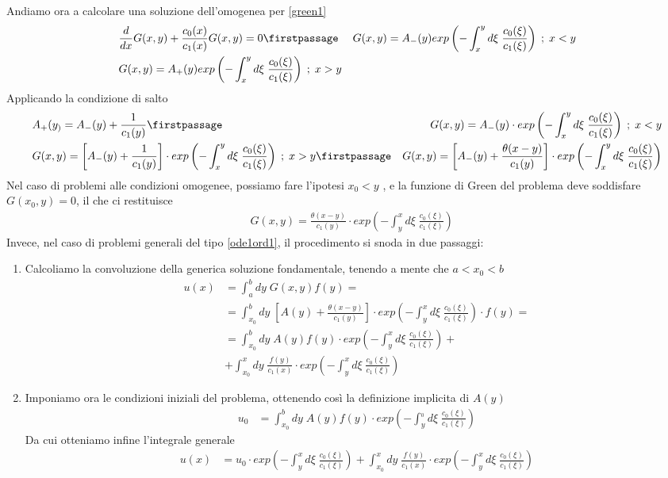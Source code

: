 \newpage
Andiamo ora a calcolare una soluzione dell'omogenea per \ref{green1}
\begin{align}
	&\frac{d}{dx}G(x,y) + \frac{c_0(x)}{c_1(x)} G(x,y)  = 0\firstpassage
	&G(x,y) = A_-(y) exp\left( - \int_{x}^{y} d\xi\; \frac{c_0(\xi)}{c_1(\xi)}\right) \; ; \;  x<y\\
	&G(x,y) = A_+(y) exp\left( - \int_{x}^{y} d\xi\; \frac{c_0(\xi)}{c_1(\xi)}\right) \; ; \; x>y
\end{align}
Applicando la condizione di salto
\begin{align}
	&A_+(y_) = A_-(y) + \frac{1}{c_1(y)} \firstpassage
	&G(x,y) = A_-(y) \cdot exp\left( - \int_{x}^{y} d\xi\; \frac{c_0(\xi)}{c_1(\xi)}\right) \; ; \;  x<y\\
	&G(x,y) = \left[  A_-(y) + \frac{1}{c_1(y)} \right] \cdot exp\left( - \int_{x}^{y} d\xi\; \frac{c_0(\xi)}{c_1(\xi)}\right) \; ; \;  x>y \firstpassage
	&G(x,y) = \left[  A_-(y) + \frac{\theta(x-y)}{c_1(y)} \right] \cdot exp\left( - \int_{x}^{y} d\xi\; \frac{c_0(\xi)}{c_1(\xi)}\right)	
\end{align}
Nel caso di problemi alle condizioni omogenee, possiamo fare l'ipotesi $x_0 < y$ , e la funzione di Green del problema deve soddisfare $G(x_0,y) = 0$, il che ci restituisce
\begin{align}
	&G(x,y) = \frac{\theta(x-y)}{c_1(y)} \cdot exp\left( - \int_{y}^{x} d\xi\; \frac{c_0(\xi)}{c_1(\xi)}\right)	
\end{align}
Invece, nel caso di problemi generali del tipo \ref{ode1ord1}, il procedimento si snoda in due passaggi:
\begin{enumerate}
	\item Calcoliamo la convoluzione della generica soluzione fondamentale, tenendo a mente che $a<x_0<b$
	\begin{align}
		u(x) &= \int_a^b dy \; G(x,y) f(y) =	\nonumber\\
		&= \int_{x_0}^b dy \;\left[  A(y) + \frac{\theta(x-y)}{c_1(y)} \right] \cdot exp\left( - \int_{y}^{x} d\xi\; \frac{c_0(\xi)}{c_1(\xi)}\right) \cdot f(y) =	\nonumber\\
		&= \int_{x_0}^b dy \; A(y) f(y) \cdot exp\left( - \int_{y}^{x} d\xi\; \frac{c_0(\xi)}{c_1(\xi)}\right) + \nonumber\\
		&+ \int_{x_0}^x dy \;  \frac{f(y)}{c_1(x)} \cdot exp\left( - \int_{y}^{x} d\xi\; \frac{c_0(\xi)}{c_1(\xi)}\right) 
	\end{align}
	\item Imponiamo ora le condizioni iniziali del problema, ottenendo così la definizione implicita di $A(y)$
	\begin{align}
		u_0 &= \int_{x_0}^b dy \; A(y) f(y) \cdot exp\left( - \int_{y}^{_0} d\xi\; \frac{c_0(\xi)}{c_1(\xi)}\right) 
	\end{align}
	Da cui otteniamo infine l'integrale generale
	\begin{align}
		u(x) &= u_0 \cdot  exp\left( - \int_{y}^{x} d\xi\; \frac{c_0(\xi)}{c_1(\xi)}\right) + \int_{x_0}^x dy \;  \frac{f(y)}{c_1(x)} \cdot exp\left( - \int_{y}^{x} d\xi\; \frac{c_0(\xi)}{c_1(\xi)}\right) 
	\end{align}
\end{enumerate}

\newpage
